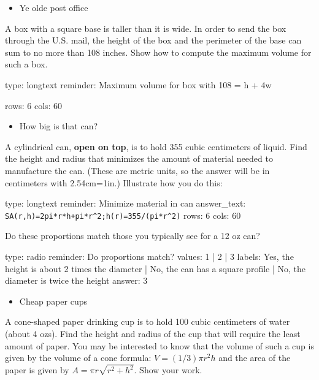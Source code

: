 \documentclass[12pt]{article}
\begin{document}
\begin{itemize}
\itemsep1pt\parskip0pt
\item
  Ye olde post office
\end{itemize}

A box with a square base is taller than it is wide. In order to send the
box through the U.S. mail, the height of the box and the perimeter of
the base can sum to no more than 108 inches. Show how to compute the
maximum volume for such a box.

\begin{answer}
type: longtext
reminder: Maximum volume for box with 108 = h + 4w

rows: 6
cols: 60
\end{answer}

\begin{itemize}
\itemsep1pt\parskip0pt
\item
  How big is that can?
\end{itemize}

A cylindrical can, \textbf{open on top}, is to hold 355 cubic
centimeters of liquid. Find the height and radius that minimizes the
amount of material needed to manufacture the can. (These are metric
units, so the answer will be in centimeters with 2.54cm=1in.) Illustrate
how you do this:

\begin{answer}
type: longtext
reminder: Minimize material in can
answer_text: \verb#SA(r,h)=2pi*r*h+pi*r^2;h(r)=355/(pi*r^2)# 
rows: 6
cols: 60
\end{answer}

Do these proportions match those you typically see for a 12 oz can?

\begin{answer}
type: radio
reminder: Do proportions match?
values: 1 | 2 | 3
labels: Yes, the height is about 2 times the diameter | No, the can has a square profile | No, the diameter is twice the height
answer: 3
\end{answer}

\begin{itemize}
\itemsep1pt\parskip0pt
\item
  Cheap paper cups
\end{itemize}

A cone-shaped paper drinking cup is to hold 100 cubic centimeters of
water (about 4 ozs). Find the height and radius of the cup that will
require the least amount of paper. You may be interested to know that
the volume of such a cup is given by the volume of a cone formula:
$V = (1/3)\pi r^2 h$ and the area of the paper is given by
$A=\pi r \sqrt{r^2 + h^2}$. Show your work.
\end{document}
